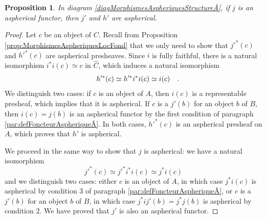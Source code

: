 \documentclass[10pt, english, a4paper, nothms]{amsart}
\theoremstyle{plain}
\newtheorem{prop}[theorem]{Proposition}
\theoremstyle{remark}
\theoremstyle{definition}
\numberwithin{equation}{theorem}
\newcommand{\pref}[1]{{\widehat{ #1 }}}
\newcommand\zbox[1]{\makebox[0pt][l]{#1}}
\newcommand\pbox[1]{\zbox{\quad #1}} %
\begin{document}
\begin{prop}\label{propFoncteurAspheriqueZigZagMorphAsph}
In diagram \ref{diagMorphismesAspheriquesStructureÂ}, if $j$ is an
aspherical functor, then $j'$ and $h'$ are aspherical.
\end{prop}
\begin{proof}
Let $c$ be an object of $C$. Recall from Proposition
\ref{prop:MorphismesAspheriquesLocFond} that we only need to show that
$j'^*(c)$ and $h'^*(c)$ are aspherical presheaves. Since $i$ is fully
faithful, there is a natural isomorphism $i^*i(c) \simeq c$ in
$\pref{C}$, which induces a natural isomorphism
\[
  h'^*(c) \simeq h'^*i^*i(c) \simeq i(c) \pbox{.}
\]
We distinguish two cases: if $c$ is an object of $A$, then $i(c)$ is a
representable presheaf, which implies that it is aspherical. If $c$ is
a $j'(b)$ for an object $b$ of $B$, then $i(c)=j(b)$ is an aspherical
functor by the first condition of paragraph \ref{par:defFoncteurAspheriqueÂ}. In
both cases, $h'^*(c)$ is an aspherical presheaf on $A$, which proves
that $h'$ is aspherical.

We proceed in the same way to show that $j$ is aspherical: we have a
natural isomorphism
\[
j'^*(c) \simeq j'^*i^*i(c) \simeq j^*i(c)
\]
and we distinguish two cases: either $c$ is an object of $A$, in which
case $j^*i(c)$ is aspherical by condition $3$ of paragraph
\ref{par:defFoncteurAspheriqueÂ}, or $c$ is a $j'(b)$ for an
object $b$ of $B$, in which case $j^*ij'(b)=j^*j(b)$ is aspherical by
condition $2$. We have proved that $j'$ is also an aspherical functor.
\end{proof}
\end{document}
